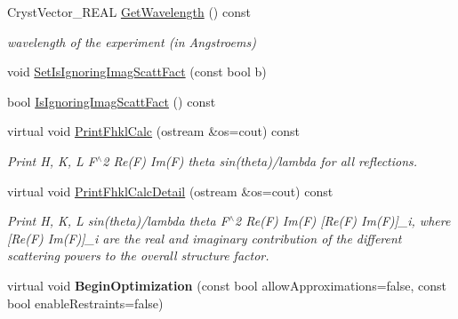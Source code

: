 \begin{DoxyCompactItemize}
\mbox{\label{class_obj_cryst_1_1_scattering_data_a406028377b84d874a68b31489d876760}} 
Cryst\+Vector\+\_\+\+R\+E\+AL \mbox{\hyperlink{class_obj_cryst_1_1_scattering_data_a406028377b84d874a68b31489d876760}{Get\+Wavelength}} () const
\begin{DoxyCompactList}\small\item\em wavelength of the experiment (in Angstroems) \end{DoxyCompactList}\item 
void \mbox{\hyperlink{class_obj_cryst_1_1_scattering_data_ae126b860d309daa78e975b8b6d8a3ec0}{Set\+Is\+Ignoring\+Imag\+Scatt\+Fact}} (const bool b)
\item 
bool \mbox{\hyperlink{class_obj_cryst_1_1_scattering_data_a441dc936d43ef67428a69c0090448bf1}{Is\+Ignoring\+Imag\+Scatt\+Fact}} () const
\item 
virtual void \mbox{\hyperlink{class_obj_cryst_1_1_scattering_data_a19b6958c0420a7e8dca0664c19f5f2f4}{Print\+Fhkl\+Calc}} (ostream \&os=cout) const
\begin{DoxyCompactList}\small\item\em Print H, K, L F$^\wedge$2 Re(\+F) Im(\+F) theta sin(theta)/lambda for all reflections. \end{DoxyCompactList}\item 
\mbox{\label{class_obj_cryst_1_1_scattering_data_ad5c9d2184e77b393317bd055a8116cc7}} 
virtual void \mbox{\hyperlink{class_obj_cryst_1_1_scattering_data_ad5c9d2184e77b393317bd055a8116cc7}{Print\+Fhkl\+Calc\+Detail}} (ostream \&os=cout) const
\begin{DoxyCompactList}\small\item\em Print H, K, L sin(theta)/lambda theta F$^\wedge$2 Re(\+F) Im(\+F) \mbox{[}Re(\+F) Im(\+F)\mbox{]}\+\_\+i, where \mbox{[}Re(\+F) Im(\+F)\mbox{]}\+\_\+i are the real and imaginary contribution of the different scattering powers to the overall structure factor. \end{DoxyCompactList}\item 
\mbox{\label{class_obj_cryst_1_1_scattering_data_affa77ed9291cf30aa652c329c0a1b4fd}} 
virtual void {\bfseries Begin\+Optimization} (const bool allow\+Approximations=false, const bool enable\+Restraints=false)
\item 
\mbox{\label{class_obj_cryst_1_1_scattering_data_af68ad7f1088f42a3b94855cfee26573e}} 

\end{DoxyCompactItemize}
